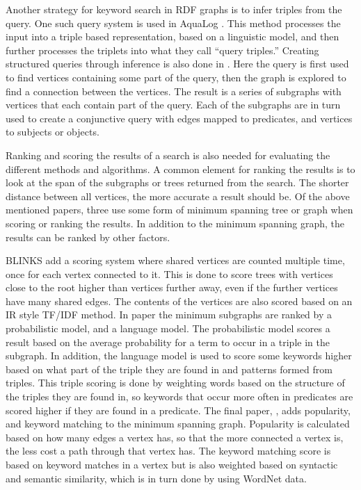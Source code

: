 Another strategy for keyword search in RDF graphs is to infer triples from the query. One such query system is used in AquaLog \cite{aqualog}. This method processes the input into a triple based representation, based on a linguistic model, and then further processes the triplets into what they call ``query triples.'' Creating structured queries through inference is also done in \cite{4812421}. Here the query is first used to find vertices containing some part of the query, then the graph is explored to find a connection between the vertices. The result is a series of subgraphs with vertices that each contain part of the query. Each of the subgraphs are in turn used to create a conjunctive query with edges mapped to predicates, and vertices to subjects or objects.

Ranking and scoring the results of a search is also needed for evaluating the different methods and algorithms. A common element for ranking the results is to look at the span of the subgraphs or trees returned from the search. The shorter distance between all vertices, the more accurate a result should be. Of the above mentioned papers, three \cite{blinks, Elbassuoni:2011:KSO:2063576.2063615, 4812421} use some form of minimum spanning tree or graph when scoring or ranking the results. In addition to the minimum spanning graph, the results can be ranked by other factors.

BLINKS add a scoring system where shared vertices are counted multiple time, once for each vertex connected to it. This is done to score trees with vertices close to the root higher than vertices further away, even if the further vertices have many shared edges. The contents of the vertices are also scored based on an IR style TF/IDF method. In paper \cite{Elbassuoni:2011:KSO:2063576.2063615} the minimum subgraphs are ranked by a probabilistic model, and a language model. The probabilistic model scores a result based on the average probability for a term to occur in a triple in the subgraph. In addition, the language model is used to score some keywords higher based on what part of the triple they are found in and patterns formed from triples. This triple scoring is done by weighting words based on the structure of the triples they are found in, so keywords that occur more often in predicates are scored higher if they are found in a predicate. The final paper, \cite{4812421}, adds popularity, and keyword matching to the minimum spanning graph. Popularity is calculated based on how many edges a vertex has, so that the more connected a vertex is, the less cost a path through that vertex has. The keyword matching score is based on keyword matches in a vertex but is also weighted based on syntactic and semantic similarity, which is in turn done by using WordNet data.

